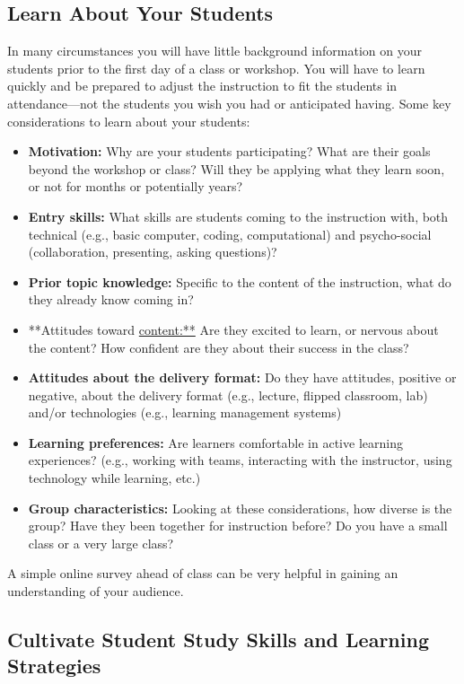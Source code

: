 \documentclass[]{book}
\providecommand{\tightlist}{%
  \setlength{\itemsep}{0pt}\setlength{\parskip}{0pt}}
\begin{document}
\subsection{Learn About Your Students}\label{learn-about-your-students}

In many circumstances you will have little background information on
your students prior to the first day of a class or workshop. You will
have to learn quickly and be prepared to adjust the instruction to fit
the students in attendance---not the students you wish you had or
anticipated having. Some key considerations to learn about your
students:

\begin{itemize}
\tightlist
\item
  \textbf{Motivation:} Why are your students participating? What are
  their goals beyond the workshop or class? Will they be applying what
  they learn soon, or not for months or potentially years?
\item
  \textbf{Entry skills:} What skills are students coming to the
  instruction with, both technical (e.g., basic computer, coding,
  computational) and psycho-social (collaboration, presenting, asking
  questions)?
\item
  \textbf{Prior topic knowledge:} Specific to the content of the
  instruction, what do they already know coming in?
\item
  **Attitudes toward \url{content:**} Are they excited to learn, or
  nervous about the content? How confident are they about their success
  in the class?
\item
  \textbf{Attitudes about the delivery format:} Do they have attitudes,
  positive or negative, about the delivery format (e.g., lecture,
  flipped classroom, lab) and/or technologies (e.g., learning management
  systems)
\item
  \textbf{Learning preferences:} Are learners comfortable in active
  learning experiences? (e.g., working with teams, interacting with the
  instructor, using technology while learning, etc.)
\item
  \textbf{Group characteristics:} Looking at these considerations, how
  diverse is the group? Have they been together for instruction before?
  Do you have a small class or a very large class?
\end{itemize}

A simple online survey ahead of class can be very helpful in gaining an
understanding of your audience.

\subsection{Cultivate Student Study Skills and Learning
Strategies}\label{cultivate-student-study-skills-and-learning-strategies}
\end{document}

